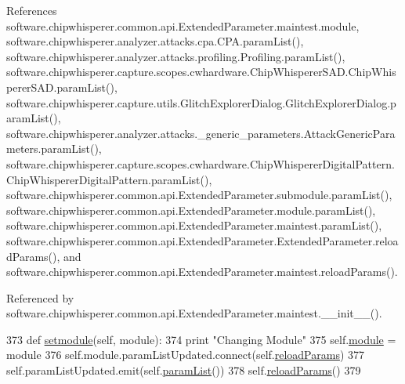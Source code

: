 References software.\+chipwhisperer.\+common.\+api.\+Extended\+Parameter.\+maintest.\+module, software.\+chipwhisperer.\+analyzer.\+attacks.\+cpa.\+C\+P\+A.\+param\+List(), software.\+chipwhisperer.\+analyzer.\+attacks.\+profiling.\+Profiling.\+param\+List(), software.\+chipwhisperer.\+capture.\+scopes.\+cwhardware.\+Chip\+Whisperer\+S\+A\+D.\+Chip\+Whisperer\+S\+A\+D.\+param\+List(), software.\+chipwhisperer.\+capture.\+utils.\+Glitch\+Explorer\+Dialog.\+Glitch\+Explorer\+Dialog.\+param\+List(), software.\+chipwhisperer.\+analyzer.\+attacks.\+\_\+generic\+\_\+parameters.\+Attack\+Generic\+Parameters.\+param\+List(), software.\+chipwhisperer.\+capture.\+scopes.\+cwhardware.\+Chip\+Whisperer\+Digital\+Pattern.\+Chip\+Whisperer\+Digital\+Pattern.\+param\+List(), software.\+chipwhisperer.\+common.\+api.\+Extended\+Parameter.\+submodule.\+param\+List(), software.\+chipwhisperer.\+common.\+api.\+Extended\+Parameter.\+module.\+param\+List(), software.\+chipwhisperer.\+common.\+api.\+Extended\+Parameter.\+maintest.\+param\+List(), software.\+chipwhisperer.\+common.\+api.\+Extended\+Parameter.\+Extended\+Parameter.\+reload\+Params(), and software.\+chipwhisperer.\+common.\+api.\+Extended\+Parameter.\+maintest.\+reload\+Params().



Referenced by software.\+chipwhisperer.\+common.\+api.\+Extended\+Parameter.\+maintest.\+\_\+\+\_\+init\+\_\+\+\_\+().


\begin{DoxyCode}
373         \textcolor{keyword}{def }\hyperlink{classsoftware_1_1chipwhisperer_1_1common_1_1api_1_1ExtendedParameter_1_1maintest_aa27fb7cb18340e9454571e41a375eac1}{setmodule}(self, module):
374             \textcolor{keywordflow}{print} \textcolor{stringliteral}{"Changing Module"}
375             self.\hyperlink{classsoftware_1_1chipwhisperer_1_1common_1_1api_1_1ExtendedParameter_1_1maintest_ad6bf58713cf6c1d36d9774022c5539cd}{module} = module
376             self.module.paramListUpdated.connect(self.\hyperlink{classsoftware_1_1chipwhisperer_1_1common_1_1api_1_1ExtendedParameter_1_1maintest_ac04a77a66b50d1e1b9911b7ea29eddd6}{reloadParams})
377             self.paramListUpdated.emit(self.\hyperlink{classsoftware_1_1chipwhisperer_1_1common_1_1api_1_1ExtendedParameter_1_1maintest_a606a166e28d055ecec331cb4172f9fe4}{paramList}())
378             self.\hyperlink{classsoftware_1_1chipwhisperer_1_1common_1_1api_1_1ExtendedParameter_1_1maintest_ac04a77a66b50d1e1b9911b7ea29eddd6}{reloadParams}()
379 
\end{DoxyCode}


